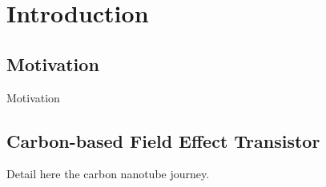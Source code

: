\chapter{\label{ch:introduction}Introduction}

\minitoc

\section{Motivation}

Motivation

\section{Carbon-based Field Effect Transistor}

Detail here the carbon nanotube journey.

